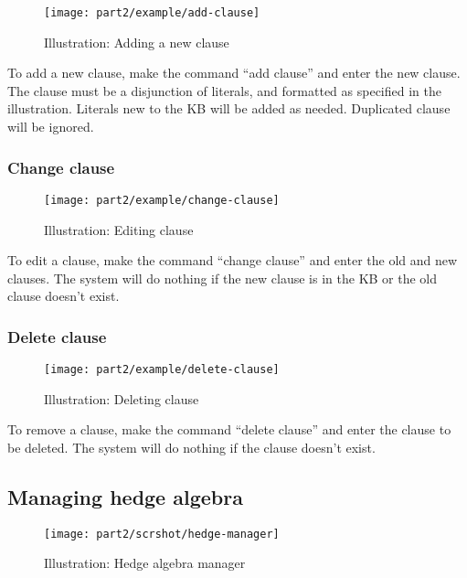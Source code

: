 \documentclass[../gr-final.tex]{subfiles}
\begin{document}
\begin{figure}[H]
  \centering
  \texttt{[image: part2/example/add-clause]}
  \caption{Illustration: Adding a new clause}
\end{figure}
To add a new clause, make the command ``add clause''
and enter the new clause. The clause must be a disjunction of
literals, and formatted as specified in the illustration.
Literals new to the KB will be added as needed.
Duplicated clause will be ignored.

\subsubsection{Change clause} 

\begin{figure}[H]
  \centering
  \texttt{[image: part2/example/change-clause]}
  \caption{Illustration: Editing clause}
\end{figure}
To edit a clause, make the command ``change clause''
and enter the old and new clauses.
The system will do nothing if the new clause is in the KB or the
old clause doesn't exist.

\subsubsection{Delete clause} 

\begin{figure}[H]
  \centering
  \texttt{[image: part2/example/delete-clause]}
  \caption{Illustration: Deleting clause}
\end{figure}
To remove a clause, make the command ``delete clause''
and enter the clause to be deleted.
The system will do nothing if the clause doesn't exist.

\subsection{Managing hedge algebra}

\begin{figure}[H]
  \centering
  \texttt{[image: part2/scrshot/hedge-manager]}
  \caption{Illustration: Hedge algebra manager}
\end{figure}
\end{document}
